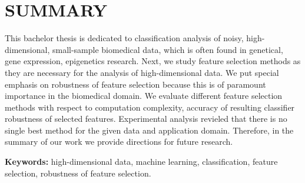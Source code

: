 \section*{SUMMARY}
\label{summary}

This bachelor thesis is dedicated to classification analysis of noisy, high-dimensional, small-sample biomedical data, which is often found in genetical, gene expression, epigenetics research. Next, we study feature selection methods as they are necessary for the analysis of high-dimensional data. We put special emphasis on robustness of feature selection because this is of paramount importance in the biomedical domain. We evaluate different feature selection methods with respect to computation complexity, accuracy of resulting classifier robustness of selected features. Experimental analysis revieled that there is no single best method for the given data and application domain. Therefore, in the summary of our work we provide directions for future research.

\textbf{Keywords:} high-dimensional data, machine learning, classification, feature selection, robustness of feature selection.
